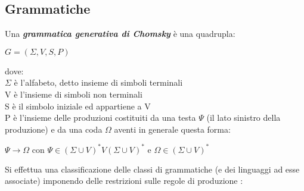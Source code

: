  \subsection{Grammatiche}
 \label{sub:gra}
 \begin{definizione*} Una \textit{\textbf{grammatica generativa di Chomsky}} è una quadrupla:\\
 
 \centerline{$G = (\Sigma, V, S, P)$}
 

 dove:\\
 $\Sigma$ è l'alfabeto, detto insieme di simboli terminali\\
 V è l'insieme di simboli non terminali\\
 S è il simbolo iniziale ed appartiene a V\\
 P è l'insieme delle produzioni costituiti da una testa $\Psi$ (il lato sinistro della produzione) e da una coda $\Omega$ aventi in generale questa forma:\\

 \centerline{$\Psi \rightarrow \Omega \text{ con } \Psi \in (\Sigma \cup V)^{*}V(\Sigma \cup V)^{*} \text{ e } \Omega \in (\Sigma \cup V)^{*}$}
 \end{definizione*}
 Si effettua una classificazione delle classi di grammatiche (e dei linguaggi ad esse associate) imponendo delle restrizioni sulle regole di produzione \cite{Chomsky59}:
